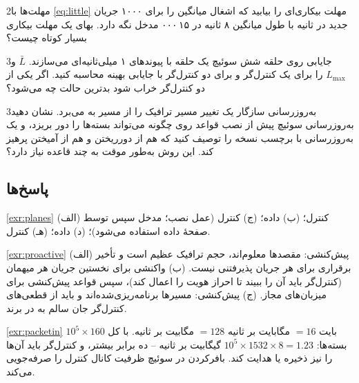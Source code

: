 \documentclass[11pt,a4paper]{article}
\begin{document}
\begin{exercisebox}{2}{مهلت‌ها}\label{exr:little}
با \cref{eq:little} مهلت بیکاری‌ای را بیابید که اشغال میانگین را برای ۱۰۰۰ جریان جدید در ثانیه با طول میانگین ۸ ثانیه در
۱۵\,۰۰۰ مدخل نگه دارد. بهای یک مهلت بیکاری بسیار کوتاه چیست؟
\end{exercisebox}

\begin{exercisebox}{3}{جایابی روی حلقه}\label{exr:place}
شش سوئیچ یک حلقه با پیوندهای ۱ میلی‌ثانیه‌ای می‌سازند. $\bar L$ و $L_{\max}$ را برای یک کنترل‌گر و برای دو کنترل‌گر با جایابی
بهینه محاسبه کنید. اگر یکی از دو کنترل‌گر خراب شود بدترین حالت چه می‌شود؟
\end{exercisebox}

\begin{exercisebox}{3}{به‌روزرسانی سازگار}\label{exr:consistent}
یک تغییر مسیر ترافیک را از مسیر  به  می‌برد. نشان دهید به‌روزرسانی سوئیچ  پیش از نصب قواعد
روی  چگونه می‌تواند بسته‌ها را دور بریزد، و یک به‌روزرسانی با برچسب نسخه را توصیف کنید که هم از دورریختن و هم از آمیختن
پرهیز کند. این روش به‌طور موقت به چند قاعده نیاز دارد؟
\end{exercisebox}

\subsection*{پاسخ‌ها}

\begin{solutionbox}{\ref{exr:planes}}
(الف) کنترل؛ (ب) داده؛ (ج) کنترل (عمل نصب؛ مدخل سپس توسط صفحهٔ داده استفاده می‌شود)؛ (د) داده؛ (هـ) کنترل.
\end{solutionbox}

\begin{solutionbox}{\ref{exr:proactive}}
(الف) پیش‌کنشی: مقصدها معلوم‌اند، حجم ترافیک عظیم است و تأخیر برقراری برای هر جریان پذیرفتنی نیست. (ب) واکنشی برای نخستین
جریان هر میهمان (کنترل‌گر باید آن را ببیند تا احراز هویت را اعمال کند)، سپس قواعد پیش‌کنشی برای میزبان‌های مجاز. (ج) پیش‌کنشی:
مسیرها برنامه‌ریزی‌شده‌اند و باید از قطعی‌های کنترل‌گر جان سالم به در برند.
\end{solutionbox}

\begin{solutionbox}{\ref{exr:packetin}}
$10^5\times160$ بایت $= 16$ مگابایت بر ثانیه $= 128$ مگابیت بر ثانیه. با کل بسته‌ها: $10^5\times1532\times8 = 1.23$ گیگابیت بر
ثانیه -- ده برابر بیشتر، و کنترل‌گر باید آن‌ها را نیز ذخیره یا هدایت کند. بافرکردن در سوئیچ ظرفیت کانال کنترل را صرفه‌جویی
می‌کند.
\end{solutionbox}
\end{document}
